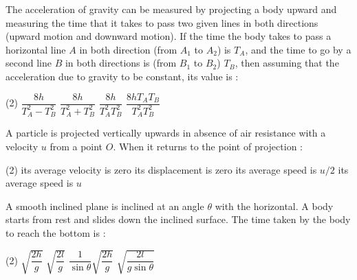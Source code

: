 \item The acceleration of gravity can be measured by projecting a body upward and measuring the time that it takes to pass two given lines in both directions (upward motion and downward motion). If the time the body takes to pass a horizontal line $A$ in both direction (from $A_1$ to $A_2$) is $T_A$, and the time to go by a second line $B$ in both directions is (from $B_1$ to $B_2$)  $T_B$, then assuming that the acceleration due to gravity to be constant, its value is : 
\begin{center}
\end{center}
\begin{tasks}(2)
\task $\dfrac{8h}{T_A^2 - T_B^2}$\ans
\task $\dfrac{8h}{T_A^2 + T_B^2}$
\task $\dfrac{8h}{T_A^2  T_B^2}$
\task $\dfrac{8hT_A  T_B}{T_A^2  T_B^2}$
\end{tasks}


\item A particle is projected vertically upwards in absence of air resistance with a velocity $u$ from a point $O$. When it returns to the point of projection :
\begin{tasks}(2)
\task its average velocity is zero\ans
\task its displacement is zero\ans
\task its average speed is $u/2$\ans
\task its average speed is $u$
\end{tasks}



\item A smooth inclined plane is inclined at an angle $\theta$ with the horizontal. A body starts from rest and slides down the inclined surface. The time taken by the body to reach the bottom is :
\begin{center}
\end{center}
\begin{tasks}(2)
\task $\sqrt{\dfrac{2h}{g}}$
\task $\sqrt{\dfrac{2l}{g}}$
\task $\dfrac{1}{\sin\theta}\sqrt{\dfrac{2h}{g}}$\ans
\task $\sqrt{\dfrac{2l}{g\sin\theta}}$\ans
\end{tasks}

